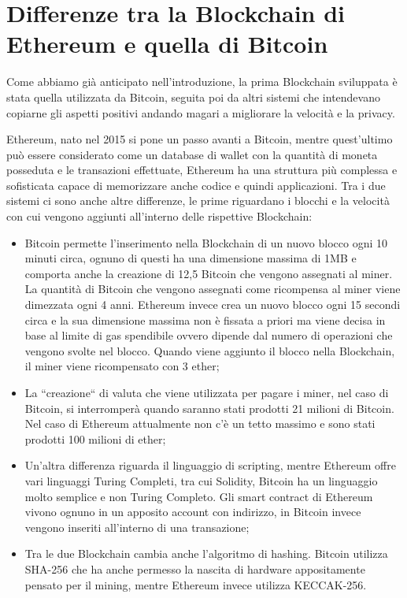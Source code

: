 \documentclass[12pt]{report}
\begin{document}
\section{Differenze tra la Blockchain di Ethereum e quella di Bitcoin}

Come abbiamo già anticipato nell'introduzione, la prima Blockchain sviluppata è stata quella utilizzata da Bitcoin, seguita poi da altri sistemi che intendevano copiarne gli aspetti positivi andando magari a migliorare la velocità e la privacy.

Ethereum, nato nel 2015 si pone un passo avanti a Bitcoin, mentre quest'ultimo può essere considerato come un database di wallet con la quantità di moneta posseduta e le transazioni effettuate, Ethereum ha una struttura più complessa e sofisticata capace di memorizzare anche codice e quindi applicazioni.
Tra i due sistemi ci sono anche altre differenze, le prime riguardano i blocchi e la velocità con cui vengono aggiunti all'interno delle rispettive Blockchain:

\begin{itemize}
\item Bitcoin permette l'inserimento nella Blockchain di un nuovo blocco ogni 10 minuti circa, ognuno di questi ha una dimensione massima di 1MB e comporta anche la creazione di 12,5 Bitcoin che vengono assegnati al miner. La quantità di Bitcoin che vengono assegnati come ricompensa al miner viene dimezzata ogni 4 anni.
Ethereum invece crea un nuovo blocco ogni 15 secondi circa e la sua dimensione massima non è fissata a priori ma viene decisa in base al limite di gas spendibile ovvero dipende dal numero di operazioni che vengono svolte nel blocco. Quando viene aggiunto il blocco nella Blockchain, il miner viene ricompensato con 3 ether;
\item La ``creazione`` di valuta che viene utilizzata per pagare i miner, nel caso di Bitcoin, si interromperà quando saranno stati prodotti 21 milioni di Bitcoin. Nel caso di Ethereum attualmente non c'è un tetto massimo e sono stati prodotti 100 milioni di ether;
\item Un'altra differenza riguarda il linguaggio di scripting, mentre Ethereum offre vari linguaggi Turing Completi, tra cui Solidity, Bitcoin ha un linguaggio molto semplice e non Turing Completo.
Gli smart contract di Ethereum vivono ognuno in un apposito account con indirizzo, in Bitcoin invece vengono inseriti all'interno di una transazione;
\item Tra le due Blockchain cambia anche l'algoritmo di hashing.
Bitcoin utilizza SHA-256 che ha anche permesso la nascita di hardware appositamente pensato per il mining, mentre Ethereum invece utilizza KECCAK-256.
\end{itemize}
\end{document}
